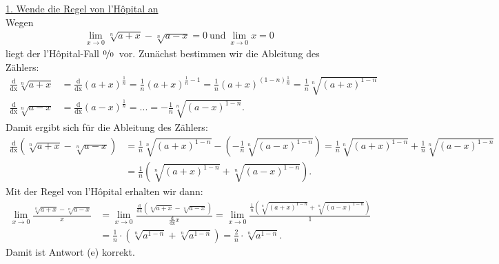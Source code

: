 \underline{1. Wende die Regel von l'H\^{o}pital an}\\
Wegen
\begin{align*}
	\lim \limits_{x \to 0} \sqrt[n]{a+x} - \sqrt[n]{a-x} = 0
	\ \textrm{und} \
	\lim \limits_{x \to 0} x = 0
\end{align*}
liegt der l'H\^{o}pital-Fall \glqq$ \nicefrac{0}{0} $\grqq~vor.
Zunächst bestimmen wir die Ableitung des Zählers:
\begin{align*}
	\frac{\mathrm{d}}{ \mathrm{dx} }\sqrt[n]{a+x}
	&=
	\frac{\mathrm{d}}{\mathrm{dx} }(a+x)^{\frac{1}{n}}
	=
	\frac{1}{n}(a+x)^{\frac{1}{n} -1}
	= 
	\frac{1}{n}(a+x)^{\left(1 - n\right) \frac{1}{n} }
	=
	\frac{1}{n}\sqrt[n]{(a+x)^{1 - n }}\\
	\frac{\mathrm{d}}{\mathrm{dx} }\sqrt[n]{a-x}
	&=
	\frac{\mathrm{d}}{\mathrm{dx} }(a-x)^{\frac{1}{n}}
	=
	...
	=
	-\frac{1}{n}\sqrt[n]{(a-x)^{1 - n }}.
\end{align*}
Damit ergibt sich für die Ableitung des Zählers:
\begin{align*}
		\frac{\mathrm{d}}{ \mathrm{dx} } \left(\sqrt[n]{a+x} - \sqrt[n]{a-x} \right)
		&=
		\frac{1}{n}\sqrt[n]{(a+x)^{1 - n }} -\left(-\frac{1}{n}\sqrt[n]{(a-x)^{1 - n }}\right)
		=
		\frac{1}{n}\sqrt[n]{(a+x)^{1 - n }} +\frac{1}{n}\sqrt[n]{(a-x)^{1 - n }}\\
		&=
		\frac{1}{n}
		\left(\sqrt[n]{(a+x)^{1 - n }}+\sqrt[n]{(a-x)^{1 - n }}\right).
\end{align*}
Mit der Regel von l'H\^{o}pital erhalten wir dann:
\begin{align*}
	\lim \limits_{x \to 0}
	\frac{\sqrt[n]{a+x} - \sqrt[n]{a-x}}{x}
	&=
	\lim \limits_{x \to 0}
	\frac{\frac{\mathrm{d}}{ \mathrm{dx} } \left(\sqrt[n]{a+x} - \sqrt[n]{a-x} \right)}{ \frac{\mathrm{d}}{ \mathrm{dx} }  x}
	=
	\lim \limits_{x \to 0}
	\frac{\frac{1}{n}
		\left(\sqrt[n]{(a+x)^{1 - n }}+\sqrt[n]{(a-x)^{1 - n }}\right)}{1}\\
	&=\frac{1}{n}\cdot
	\left(\sqrt[n]{a^{1 - n }} + \sqrt[n]{a^{1 - n }}\right)
	=
	\frac{2}{n} \cdot \sqrt[n]{a^{1 - n }}.
\end{align*}
Damit ist Antwort (e) korrekt.


\newpage
